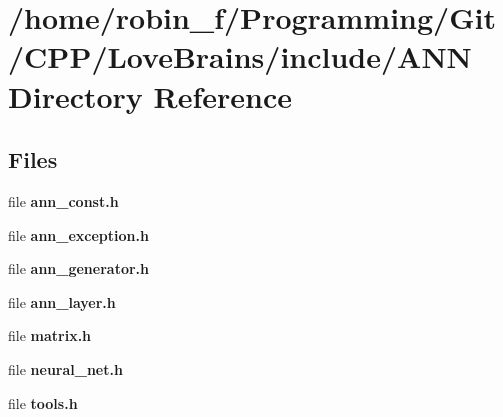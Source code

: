 \section{/home/robin\+\_\+f/\+Programming/\+Git/\+C\+P\+P/\+Love\+Brains/include/\+A\+N\+N Directory Reference}
\label{dir_2789336f74e924295bfcdfc166eb8e72}
\subsection*{Files}
\begin{DoxyCompactItemize}
\item 
file {\bfseries ann\+\_\+const.\+h}
\item 
file {\bfseries ann\+\_\+exception.\+h}
\item 
file {\bfseries ann\+\_\+generator.\+h}
\item 
file {\bfseries ann\+\_\+layer.\+h}
\item 
file {\bfseries matrix.\+h}
\item 
file {\bfseries neural\+\_\+net.\+h}
\item 
file {\bfseries tools.\+h}
\end{DoxyCompactItemize}

